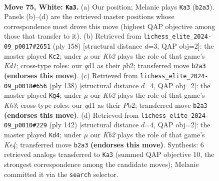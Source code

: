 \documentclass[11pt]{article}
\begin{document}
\clearpage

\begin{figure}[p]\centering
\begin{subfigure}{0.46\textwidth}\centering
\resizebox{\linewidth}{!}{%
\newchessgame
\chessboard[
  setfen={8/8/1p6/p7/2P4k/8/1K6/3q4 w - - 6 75},
  showmover=false,
  pgfstyle=straightmove, color=movearrow, markmove={b2-a3}
]}
\caption{}
\end{subfigure}\hfill
\begin{subfigure}{0.46\textwidth}\centering
\resizebox{\linewidth}{!}{%
\newchessgame
\chessboard[
  setfen={8/8/8/3k2p1/5pP1/8/1p6/3K4 w - - 0 80},
  showmover=false,
  pgfstyle=straightmove, color=movearrow, markmove={d1-c2}
]}
\caption{}
\end{subfigure}
\\[4pt]
\begin{subfigure}{0.46\textwidth}\centering
\resizebox{\linewidth}{!}{%
\newchessgame
\chessboard[
  setfen={8/8/5k2/3p4/2p5/4P2K/1P6/8 w - - 0 70},
  showmover=false,
  pgfstyle=straightmove, color=movearrow, markmove={h3-g4}
]}
\caption{}
\end{subfigure}\hfill
\begin{subfigure}{0.46\textwidth}\centering
\resizebox{\linewidth}{!}{%
\newchessgame
\chessboard[
  setfen={8/8/p4k2/Pp6/4K3/8/8/8 w - - 0 72},
  showmover=false,
  pgfstyle=straightmove, color=movearrow, markmove={e4-d4}
]}
\caption{}
\end{subfigure}
\caption{\textbf{Move 75, White: \texttt{Ka3}.} (a) Our position; Melanie plays \texttt{Ka3} (\texttt{b2a3}). Panels (b)--(d) are the retrieved master positions whose correspondence most drove this move (highest QAP objective among those that transfer to it). (b) Retrieved from \texttt{lichess\_elite\_2024-09\_p0017\#2651} (ply 158) [structural distance $d$=3, QAP obj=2]: the master played \texttt{Kc2}; under $\mu$ our \emph{Kb2} plays the role of that game's \emph{Kd1}; cross-type roles: our \emph{q}d1 as their \emph{p}b2; transferred move \texttt{b2a3} \textbf{(endorses this move)}. (c) Retrieved from \texttt{lichess\_elite\_2024-09\_p0018\#656} (ply 138) [structural distance $d$=4, QAP obj=2]: the master played \texttt{Kg4}; under $\mu$ our \emph{Kb2} plays the role of that game's \emph{Kh3}; cross-type roles: our \emph{q}d1 as their \emph{P}b2; transferred move \texttt{b2a3} \textbf{(endorses this move)}. (d) Retrieved from \texttt{lichess\_elite\_2024-09\_p0010\#229} (ply 142) [structural distance $d$=4, QAP obj=2]: the master played \texttt{Kd4}; under $\mu$ our \emph{Kb2} plays the role of that game's \emph{Ke4}; transferred move \texttt{b2a3} \textbf{(endorses this move)}. Synthesis: 6 retrieved analogs transferred to \texttt{Ka3} (summed QAP objective 10, the strongest correspondence among the candidate moves); Melanie committed it via the \texttt{search} selector.}
\label{fig:thought-m148}
\end{figure}
\end{document}
